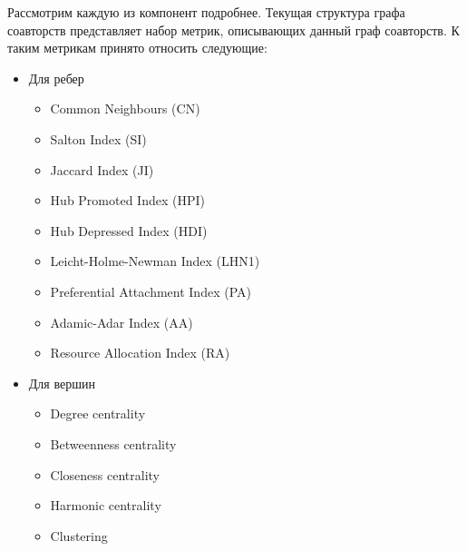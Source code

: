 Рассмотрим каждую из компонент подробнее. Текущая структура графа соавторств представляет набор метрик, описывающих данный граф соавторств.
К таким метрикам принято относить следующие: 
\begin{itemize}
\item Для ребер
\begin{itemize}
\item Common Neighbours (CN)
\item Salton Index (SI)
\item Jaccard Index (JI)
\item Hub Promoted Index (HPI)
\item Hub Depressed Index (HDI)
\item Leicht-Holme-Newman Index (LHN1)
\item Preferential Attachment Index (PA)
\item Adamic-Adar Index (AA)
\item Resource Allocation Index (RA)
\end{itemize}
\item Для вершин 
\begin{itemize}
\item Degree centrality
\item Betweenness centrality
\item Closeness centrality
\item Harmonic centrality
\item Clustering
\end{itemize}
\end{itemize}

